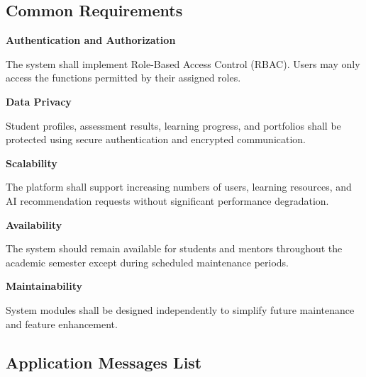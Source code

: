\subsection{Common Requirements}

\textbf{Authentication and Authorization}

The system shall implement Role-Based Access Control (RBAC). Users may only access the functions permitted by their assigned roles.

\vspace{0.3cm}

\textbf{Data Privacy}

Student profiles, assessment results, learning progress, and portfolios shall be protected using secure authentication and encrypted communication.

\vspace{0.3cm}

\textbf{Scalability}

The platform shall support increasing numbers of users, learning resources, and AI recommendation requests without significant performance degradation.

\vspace{0.3cm}

\textbf{Availability}

The system should remain available for students and mentors throughout the academic semester except during scheduled maintenance periods.

\vspace{0.3cm}

\textbf{Maintainability}

System modules shall be designed independently to simplify future maintenance and feature enhancement.

\subsection{Application Messages List}

